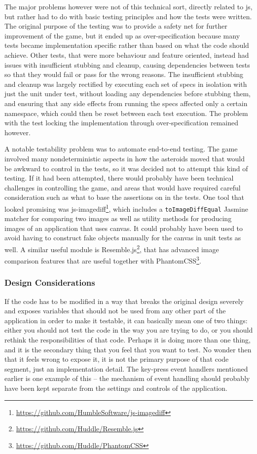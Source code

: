 \documentclass[11pt]{article}
\begin{document}
The major problems however were not of this technical sort, directly related to \gls{js}, but rather had to do with basic testing principles and how the tests were written. The original purpose of the testing was to provide a safety net for further improvement of the game, but it ended up as over-specification because many tests became implementation specific rather than based on what the code should achieve. Other tests, that were more behaviour and feature oriented, instead had issues with insufficient stubbing and cleanup, causing dependencies between tests so that they would fail or pass for the wrong reasons. The insufficient stubbing and cleanup was largely rectified by executing each set of specs in isolation with just the unit under test, without loading any dependencies before stubbing them, and ensuring that any side effects from running the specs affected only a certain namespace, which could then be reset between each test execution. The problem with the test locking the implementation through over-specification remained however.

A notable testability problem was to automate end-to-end testing. The game involved many nondeterministic aspects in how the asteroids moved that would be awkward to control in the tests, so it was decided not to attempt this kind of testing. If it had been attempted, there would probably have been technical challenges in controlling the game, and areas that would have required careful consideration such as what to base the assertions on in the tests. One tool that looked promising was js-imagediff\footnote{\url{https://github.com/HumbleSoftware/js-imagediff}}, which includes a \texttt{toImageDiffEqual} Jasmine matcher for comparing two images as well as utility methods for producing images of an application that uses canvas. It could probably have been used to avoid having to construct fake objects manually for the canvas in unit tests as well. A similar useful module is Resemble.js\footnote{\url{https://github.com/Huddle/Resemble.js}}, that has advanced image comparison features that are useful together with PhantomCSS\footnote{\url{https://github.com/Huddle/PhantomCSS}}.

\subsubsection{Design Considerations}

If the code has to be modified in a way that breaks the original design severely and exposes variables that should not be used from any other part of the application in order to make it testable, it can basically mean one of two things: either you should not test the code in the way you are trying to do, or you should rethink the responsibilities of that code. Perhaps it is doing more than one thing, and it is the secondary thing that you feel that you want to test. No wonder then that it feels wrong to expose it, it is not the primary purpose of that code segment, just an implementation detail. The key-press event handlers mentioned earlier is one example of this -- the mechanism of event handling should probably have been kept separate from the settings and controls of the application.
\end{document}
